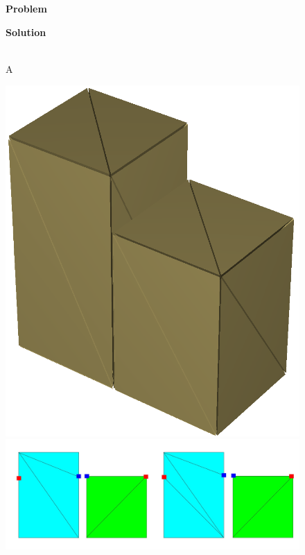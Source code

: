 \begin{figure}[t]
\begin{minipage}{0.9\linewidth}
\centering
\begin{minipage}{0.48\textwidth}
\begin{center}
\textbf{Problem}
\end{center}
\end{minipage}
\begin{minipage}{0.48\textwidth}
\begin{center}
\textbf{Solution}
\end{center}
\end{minipage}
\\
A
\begin{minipage}{0.25\textwidth}
\includegraphics[width=\textwidth]{images/TetraMesh_WithNullFaces_crop.png}
\end{minipage}
\begin{minipage}{0.45\textwidth}
\includegraphics[width=\textwidth]{images/Subdivision_Example_2.jpg}

\end{minipage}
\end{minipage}
\end{figure}
